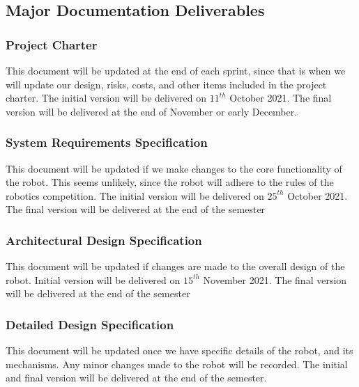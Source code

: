 
\subsection{Major Documentation Deliverables}


\subsubsection{Project Charter}
This document will be updated at the end of each sprint, since that is when we will update our design, risks, costs, and other items included in the project charter. The initial version will be delivered on $11^{th}$ October 2021. The final version will be delivered at the end of November or early December. 

\subsubsection{System Requirements Specification}
This document will be updated if we make changes to the core functionality of the robot. This seems unlikely, since the robot will adhere to the rules of the robotics competition. The initial version will be delivered on $25^{th}$ October 2021. The final version will be delivered at the end of the semester 

\subsubsection{Architectural Design Specification}
This document will be updated if changes are made to the overall design of the robot. Initial version will be delivered on $15^{th}$ November 2021. The final version will be delivered at the end of the semester 

\subsubsection{Detailed Design Specification}
This document will be updated once we have specific details of the robot, and its mechanisms. Any minor changes made to the robot will be recorded. The initial and final version will be delivered at the end of the semester. 

